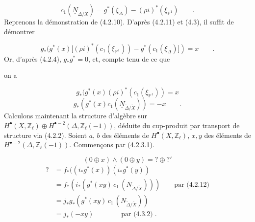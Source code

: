 \begin{equation*}
c_1(\underline{N}_{\widetilde{\Delta}/\widetilde{X}}) = g^*(\xi_\Delta) - (\rho i)^*(\xi_{\mathbb{P}^1}) \qquad .
\end{equation*}
Reprenons la démonstration de (4.2.10). D'après (4.2.11) et (4.3), il suffit de démontrer

\begin{equation*}
g_*(g^*(x)[(\rho i)^* (c_1(\xi_{\mathbb{P}^1})) - g^*(c_1(\xi_\Delta)]) = x \qquad .
\end{equation*}
Or, d'après (4.2.4), $g_*g^* = 0$, et, compte tenu de ce que

\begin{center}
\end{center}
on a

\begin{equation}\tag{4.3.1}
g_*(g^*(x) (\rho i)^*(c_1(\xi_{\mathbb{P}^1})) = x
\end{equation}
\begin{equation}\tag{4.3.2}
g_*(g^*(x) c_1(\underline{N}_{\widetilde{\Delta}/\widetilde{X}})) = - x \qquad .
\end{equation}
Calculons maintenant la structure d'algèbre sur $H^{\bullet}(X,\mathbb{Z}_{\ell}) \oplus H^{\bullet-2}(\Delta, \mathbb{Z}_{\ell}(-1))$, déduite du cup-produit par transport de structure via (4.2.2). Soient $a$, $b$ des éléments de $H^{\bullet}(X,\mathbb{Z}_{\ell})$, $x,y$ des éléments de $H^{\bullet-2}(\Delta,\mathbb{Z}_{\ell}(-1))$. Commençons par (4.2.3.1).

\begin{equation*}
(0 \oplus x) \wedge (0 \oplus y) = ? \oplus ?'
\end{equation*}
\begin{equation*}
\begin{aligned}
? &= f_*((i_*g^*(x))(i_*g^*(y)) \\
&= f_*(i_*(g^*(xy)\, c_1\, (N_{\widetilde{\Delta}/\widetilde{X}}))) \qquad \text{par (4.2.12)} \\
&= j_*g_*(g^*(xy)\, c_1\, (N_{\widetilde{\Delta}/\widetilde{X}})) \\
&= j_*(-xy) \qquad\qquad \text{par (4.3.2)} \;.
\end{aligned}
\end{equation*}

